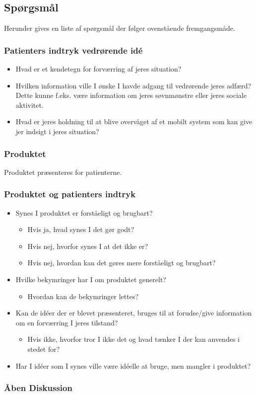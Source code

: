 \subsection*{Spørgsmål}
Herunder gives en liste af spørgsmål der følger ovenstående fremgangsmåde.

\subsubsection{Patienters indtryk vedrørende idé}
\begin{itemize}
\item Hvad er et kendetegn for forværring af jeres situation?
\item Hvilken information ville I ønske I havde adgang til vedrørende jeres adfærd? Dette kunne f.eks. være information om jeres søvnmønstre eller jeres sociale aktivitet.
\item Hvad er jeres holdning til at blive overvåget af et mobilt system som kan give jer indsigt i jeres situation?
\end{itemize}

\subsubsection*{Produktet}
Produktet præsenteres for patienterne.

\subsubsection*{Produktet og patienters indtryk}
\begin{itemize}
\item Synes I produktet er forståeligt og brugbart?
	{\begin{itemize}
	\item Hvis ja, hvad synes I det gør godt?
	\item Hvis nej, hvorfor synes I at det ikke er?
	\item Hvis nej, hvordan kan det gøres mere forståeligt og brugbart?
	\end{itemize}}
\item Hvilke bekymringer har I om produktet generelt?
	{\begin{itemize}
	\item Hvordan kan de bekymringer lettes?
	\end{itemize}}
\item Kan de idéer der er blevet præsenteret, bruges til at forudse/give information om en forværring I jeres tilstand? 
	{\begin{itemize}
	\item Hvis ikke, hvorfor tror I ikke det og hvad tænker I der kan anvendes i stedet for?
	\end{itemize}}
\item Har I idéer som I synes ville være idéelle at bruge, men mangler i produktet?
\end{itemize}

\subsubsection*{Åben Diskussion}

